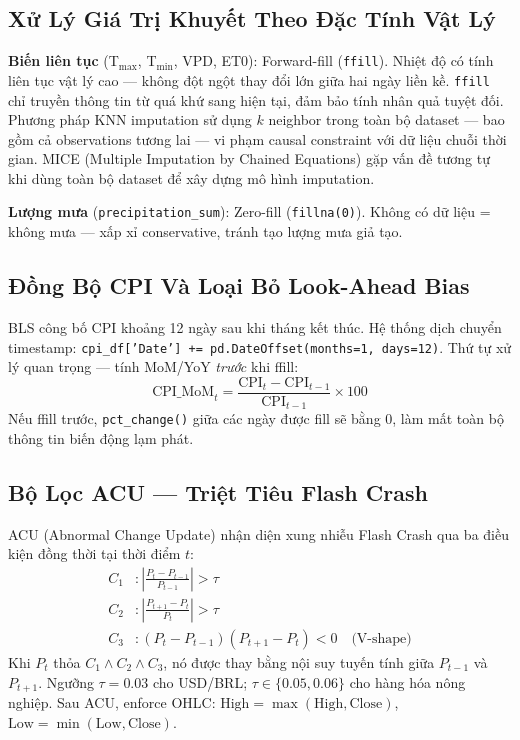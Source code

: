 \documentclass[conference]{IEEEtran}
\begin{document}
\subsection{Xử Lý Giá Trị Khuyết Theo Đặc Tính Vật Lý}

\textbf{Biến liên tục} (T$_{\max}$, T$_{\min}$, VPD, ET0): Forward-fill
(\texttt{ffill}). Nhiệt độ có tính liên tục vật lý cao — không đột ngột thay
đổi lớn giữa hai ngày liền kề. \texttt{ffill} chỉ truyền thông tin từ quá
khứ sang hiện tại, đảm bảo tính nhân quả tuyệt đối. Phương pháp KNN
imputation sử dụng $k$ neighbor trong toàn bộ dataset — bao gồm cả
observations tương lai — vi phạm causal constraint với dữ liệu chuỗi thời
gian. MICE (Multiple Imputation by Chained Equations) gặp vấn đề tương tự
khi dùng toàn bộ dataset để xây dựng mô hình imputation.

\textbf{Lượng mưa} (\texttt{precipitation\_sum}): Zero-fill (\texttt{fillna(0)}).
Không có dữ liệu = không mưa — xấp xỉ conservative, tránh tạo lượng mưa
giả tạo.

\subsection{Đồng Bộ CPI Và Loại Bỏ Look-Ahead Bias}

BLS công bố CPI khoảng 12 ngày sau khi tháng kết thúc. Hệ thống dịch chuyển
timestamp: \texttt{cpi\_df['Date'] += pd.DateOffset(months=1, days=12)}.
Thứ tự xử lý quan trọng — tính MoM/YoY \emph{trước} khi ffill:
\begin{equation}
\text{CPI\_MoM}_t = \frac{\text{CPI}_t - \text{CPI}_{t-1}}{\text{CPI}_{t-1}}
\times 100
\end{equation}
Nếu ffill trước, \texttt{pct\_change()} giữa các ngày được fill sẽ bằng 0,
làm mất toàn bộ thông tin biến động lạm phát.

\subsection{Bộ Lọc ACU — Triệt Tiêu Flash Crash}

ACU (Abnormal Change Update) nhận diện xung nhiễu Flash Crash qua ba điều
kiện đồng thời tại thời điểm $t$:
\begin{align}
C_1 &: \left|\frac{P_t - P_{t-1}}{P_{t-1}}\right| > \tau \\
C_2 &: \left|\frac{P_{t+1} - P_t}{P_t}\right| > \tau \\
C_3 &: (P_t - P_{t-1})(P_{t+1} - P_t) < 0 \quad \text{(V-shape)}
\end{align}
Khi $P_t$ thỏa $C_1 \wedge C_2 \wedge C_3$, nó được thay bằng nội suy tuyến
tính giữa $P_{t-1}$ và $P_{t+1}$. Ngưỡng $\tau = 0.03$ cho USD/BRL;
$\tau \in \{0.05, 0.06\}$ cho hàng hóa nông nghiệp. Sau ACU, enforce OHLC:
$\text{High} = \max(\text{High}, \text{Close})$, $\text{Low} = \min(\text{Low},
\text{Close})$.
\end{document}
